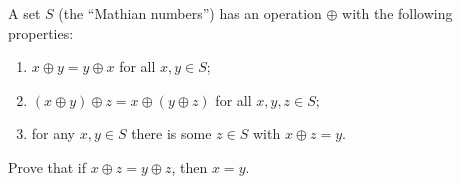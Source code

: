 A set $S$ (the ``Mathian numbers'') has an operation $\oplus$ with the following properties:
\begin{enumerate}
\item $x\oplus y=y\oplus x$ for all $x,y\in S$;
\item $(x\oplus y)\oplus z=x\oplus(y\oplus z)$ for all $x,y,z\in S$;
\item for any $x,y\in S$ there is some $z\in S$ with $x\oplus z=y$.
\end{enumerate}
Prove that if $x\oplus z=y\oplus z$, then $x=y$.
